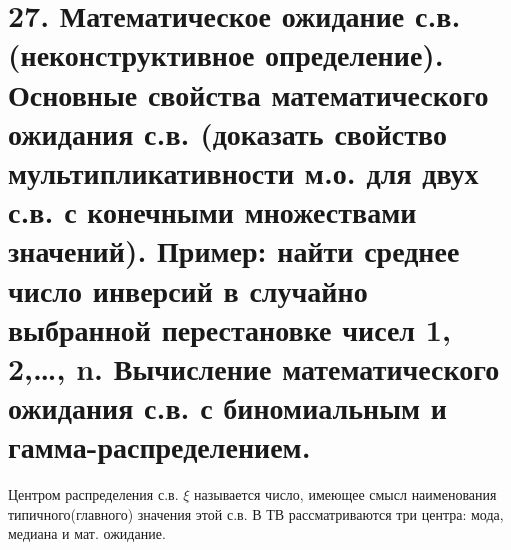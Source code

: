 \section{27.	Математическое ожидание с.в. (неконструктивное определение). Основные свойства математического ожидания с.в. (доказать свойство мультипликативности м.о. для двух с.в. с конечными множествами значений). Пример: найти среднее число инверсий  в случайно выбранной перестановке чисел 1, 2,…, n. Вычисление математического ожидания с.в. с биномиальным и  гамма-распределением.}

\begin{defs}
  Центром распределения с.в. $\xi$ называется число, имеющее смысл наименования типичного(главного)
  значения этой с.в. В ТВ рассматриваются три центра: мода, медиана и мат. ожидание.
\end{defs}

